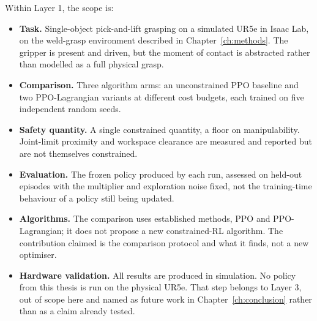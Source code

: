 Within Layer 1, the scope is:

\begin{itemize}
  \item \textbf{Task.} Single-object pick-and-lift grasping on a simulated UR5e in Isaac Lab, on
  the weld-grasp environment described in Chapter~\ref{ch:methods}. The gripper is present and
  driven, but the moment of contact is abstracted rather than modelled as a full physical grasp.
  \item \textbf{Comparison.} Three algorithm arms: an unconstrained PPO baseline and two
  PPO-Lagrangian variants at different cost budgets, each trained on five independent random
  seeds.
  \item \textbf{Safety quantity.} A single constrained quantity, a floor on manipulability.
  Joint-limit proximity and workspace clearance are measured and reported but are not themselves
  constrained.
  \item \textbf{Evaluation.} The frozen policy produced by each run, assessed on held-out episodes
  with the multiplier and exploration noise fixed, not the training-time behaviour of a policy
  still being updated.
  \item \textbf{Algorithms.} The comparison uses established methods, PPO and PPO-Lagrangian; it
  does not propose a new constrained-RL algorithm. The contribution claimed is the comparison
  protocol and what it finds, not a new optimiser.
  \item \textbf{Hardware validation.} All results are produced in simulation. No policy from this
  thesis is run on the physical UR5e. That step belongs to Layer 3, out of scope here and named as
  future work in Chapter~\ref{ch:conclusion} rather than as a claim already tested.
\end{itemize}
